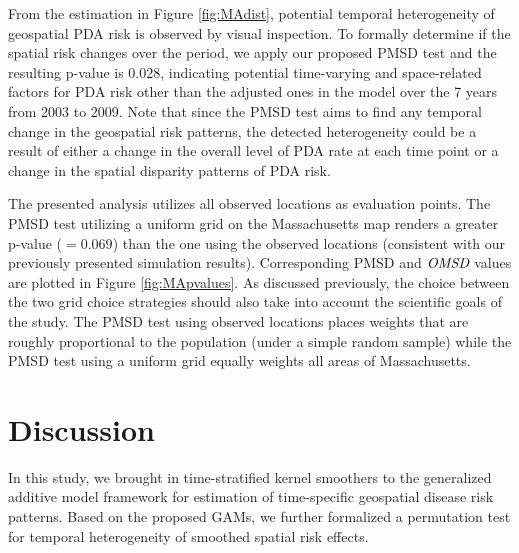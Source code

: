 	From the estimation in Figure \ref{fig:MAdist}, potential temporal heterogeneity of geospatial PDA risk is observed by visual inspection. To formally determine if the spatial risk changes over the period, we apply our proposed PMSD test and the resulting p-value is $0.028$, indicating potential time-varying and space-related factors for PDA risk other than the adjusted ones in the model over the 7 years from 2003 to 2009. Note that since the PMSD test aims to find any temporal change in the geospatial risk patterns, the detected heterogeneity could be a result of either a change in the overall level of PDA rate at each time point or a change in the spatial disparity patterns of PDA risk.
	
	The presented analysis utilizes all observed locations as evaluation points. The PMSD test utilizing a uniform grid on the Massachusetts map renders a greater p-value ($=0.069$) than the one using the observed locations (consistent with our previously presented simulation results). Corresponding PMSD and $\emph{OMSD}$ values are plotted in Figure \ref{fig:MApvalues}. As discussed previously, the choice between the two grid choice strategies should also take into account the scientific goals of the study. The PMSD test using observed locations places weights that are roughly proportional to the population (under a simple random sample) while the PMSD test using a uniform grid equally weights all areas of Massachusetts. 
	
	\section{Discussion}
	In this study, we brought in time-stratified kernel smoothers to the generalized additive model framework for estimation of time-specific geospatial disease risk patterns. Based on the proposed GAMs, we further formalized a permutation test for temporal heterogeneity of smoothed spatial risk effects.
	
